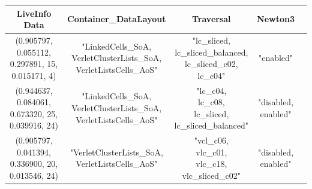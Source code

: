 \begin{table}[H]
    \footnotesize
    \centering
    \begin{tabular}{|c|c|c|c|c|}
        \hline

        \textbf{LiveInfo Data} & \textbf{Container\_DataLayout} & \textbf{Traversal} & \textbf{Newton3} \\
        \hline
        \makecell{(0.905797,	0.055112,                                                                   \\	0.297891,	15,	0.015171,	4) }                                                                                                              & \makecell{"LinkedCells\_SoA,                                                \\ VerletClusterLists\_SoA, \\ VerletListsCells\_AoS"} & \makecell{"lc\_sliced,\\ lc\_sliced\_balanced,\\ lc\_sliced\_c02,\\ lc\_c04"} & "enabled"          \\
        \hline
        \makecell{(0.944637,	0.084061,                                                                   \\	0.673320,                                                                                                                                                                                                   	25,	0.039916, 24) }                                                                                                               & \makecell{"LinkedCells\_SoA,                                                \\ VerletClusterLists\_SoA, \\ VerletListsCells\_AoS"} & \makecell{"lc\_c04,\\ lc\_c08,\\ lc\_sliced,\\ lc\_sliced\_balanced"} &  \makecell{"disabled,\\enabled"}         \\
        \hline
        \makecell{(0.905797,	0.041394,                                                                   \\	0.336900,                                                                                                                                                                                                   	20,	0.013546, 24) }                                                                                                               & \makecell{"VerletClusterLists\_SoA,                                         \\ VerletListsCells\_AoS"} & \makecell{"vcl\_c06,\\ vlc\_c01,\\ vlc\_c18,\\ vlc\_sliced\_c02"} &  \makecell{"disabled,\\enabled"}         \\
        \hline


\end{tabular}
\end{table}
